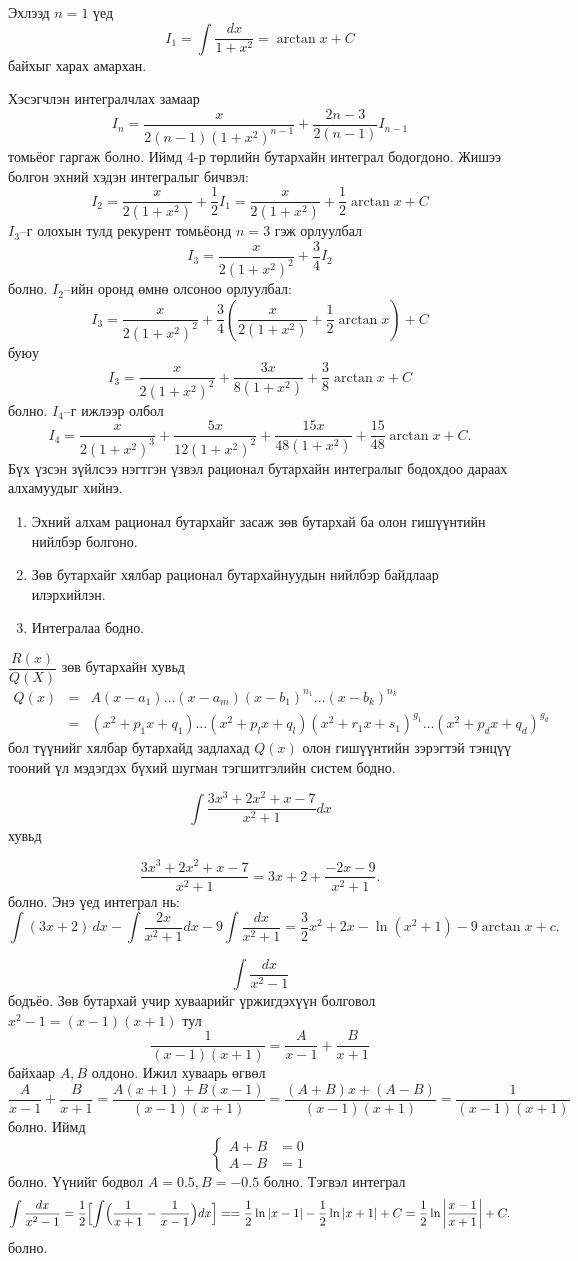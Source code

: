 Эхлээд $n=1$ үед
\[
I_1 = \int \frac{dx}{1+x^2} = \arctan x+C
\]
байхыг харах амархан. 

Хэсэгчлэн интегралчлах замаар
\[
I_n = \frac{x}{2(n-1)(1+x^2)^{n-1}} + \frac{2n-3}{2(n-1)} I_{n-1}
\]
томьёог гаргаж болно. Иймд 4-р төрлийн бутархайн интеграл бодогдоно. Жишээ болгон эхний хэдэн интегралыг бичвэл:
\[
I_2=\frac{x}{2(1+x^2)}+\frac12 I_1
   =\frac{x}{2(1+x^2)}+\frac12\arctan x+C
\]
$I_3$–г олохын тулд рекурент томьёонд $n=3$ гэж орлуулбал
\[
I_3=\frac{x}{2(1+x^2)^2}+\frac34 I_2
\] болно.
$I_2$–ийн оронд өмнө олсоноо орлуулбал:
\[
I_3=\frac{x}{2(1+x^2)^2}
    +\frac{3}{4}\left(\frac{x}{2(1+x^2)}+\frac12\arctan x\right)+C
\]
буюу
\[
I_3=
\frac{x}{2(1+x^2)^2}
+\frac{3x}{8(1+x^2)}
+\frac{3}{8}\arctan x+C
\]
болно.
$I_4$–г ижлээр олбол
\[
I_4=
\frac{x}{2(1+x^2)^3}
+\frac{5x}{12(1+x^2)^2}
+\frac{15x}{48(1+x^2)}
+\frac{15}{48}\arctan x+C.
\]
Бүх үзсэн зүйлсээ нэгтгэн үзвэл рационал бутархайн интегралыг бодохдоо дараах алхамуудыг хийнэ. 
\begin{enumerate}
    \item Эхний алхам рационал бутархайг засаж зөв бутархай ба олон гишүүнтийн нийлбэр болгоно.
    \item Зөв бутархайг хялбар рационал бутархайнуудын нийлбэр байдлаар илэрхийлэн.
    \item Интегралаа бодно.
\end{enumerate}
$\dfrac{R(x)}{Q(X)}$ зөв бутархайн хувьд
\begin{eqnarray}
Q(x)&=&A(x-a_1)\ldots (x-a_m)(x-b_1)^{n_1}\ldots (x-b_k)^{n_k}\nonumber\\
   &=& (x^2+p_1x+q_1)\ldots (x^2+p_lx+q_l)(x^2+r_1x+s_1)^{g_1}\ldots (x^2+p_dx+q_d)^{g_d}\nonumber
\end{eqnarray} бол түүнийг хялбар бутархайд задлахад $Q(x)$ олон гишүүнтийн зэрэгтэй тэнцүү тооний үл мэдэгдэх бүхий шугман тэгшитгэлийн систем бодно.
\begin{example}
$$
\int\frac{3x^3+2x^2+x-7}{x^2+1} dx$$ хувьд

 \[
\frac{3x^3+2x^2+x-7}{x^2+1}
=
3x+2+\frac{-2x-9}{x^2+1}.
\]
болно. 
Энэ үед интеграл нь:
\[
\int (3x+2)\,dx - \int\frac{2x}{x^2+1}dx - 9\int\frac{dx}{x^2+1}=\dfrac{3}{2}x^2+2x-\ln(x^2+1)-9\arctan x+c.
\]   
\end{example} 
\begin{example}
\[
\int \frac{dx}{x^2-1}
\]
бодъёо. Зөв бутархай учир хуваарийг үржигдэхүүн болговол ${x^2-1}=(x-1)(x+1)$ тул
\[
\frac{1}{(x-1)(x+1)}=\frac{A}{x-1}+\frac{B}{x+1}
\]
 байхаар $A, B$ олдоно. Ижил хуваарь өгвөл 
 \[
\frac{A}{x-1}+\frac{B}{x+1}=\frac{A(x+1)+B(x-1)}{(x-1)(x+1)}=\frac{(A+B)x+(A-B)}{(x-1)(x+1)}=\frac{1}{(x-1)(x+1)}
\] болно. Иймд 
$$
\begin{cases}
    A+B&=0\\
    A-B&=1
\end{cases}$$ болно. Үүнийг бодвол $A=0.5, B=-0.5$ болно. 
Тэгвэл интеграл
\[
\int \frac{dx}{x^2-1}=\frac12\Bigl[\int \Bigl(\dfrac{1}{x+1}-\dfrac{1}{x-1}\Bigr)dx\Bigr]==\frac12\ln|x-1|-\frac12\ln|x+1|+C
=\frac12\ln\left|\frac{x-1}{x+1}\right|+C.
\]
 болно.
\end{example}
